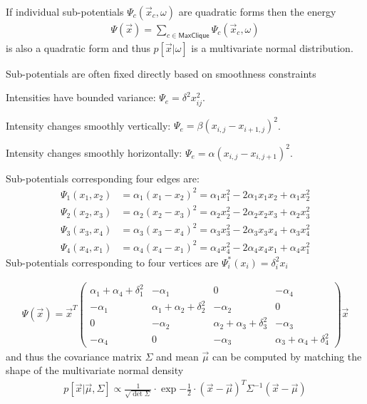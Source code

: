 \documentclass[landscape,footrule]{foils}
\begin{document}

If individual sub-potentials $\Psi_c(\vec{x}_c,\omega)$ are quadratic forms then the energy 
\begin{align*}
\Psi(\vec{x})=\sum_{c\in\textsf{MaxClique}}\Psi_c(\vec{x}_c,\omega) 
\end{align*} 
is also a quadratic form and thus $p[\vec{x}|\omega]$ is a multivariate normal distribution.\vspace*{1cm}

Sub-potentials are often fixed directly based on smoothness constraints
\begin{triangles}
\item Intensities have bounded variance: $\Psi_e=\delta^2 x_{ij}^2$. 
\item Intensity changes smoothly vertically: $\Psi_e=\beta(x_{i,j}-x_{i+1,j})^2$.
\item Intensity changes smoothly horizontally: $\Psi_e=\alpha(x_{i,j}-x_{i,j+1})^2$.
\end{triangles} 


\vspace*{-0.6cm}

Sub-potentials corresponding four edges are:  
\begin{align*}
\Psi_1(x_1,x_2)&= \alpha_1(x_{1}-x_2)^2=\alpha_1 x_1^2-2\alpha_1 x_1x_2+\alpha_1 x_2^2\\
\Psi_2(x_2,x_3)&= \alpha_2(x_{2}-x_3)^2=\alpha_2 x_2^2-2\alpha_2 x_2x_3+\alpha_2 x_3^2\\
\Psi_3(x_3,x_4)&= \alpha_3(x_{3}-x_4)^2=\alpha_3 x_3^2-2\alpha_3 x_3x_4+\alpha_3 x_4^2\\
\Psi_4(x_4,x_1)&= \alpha_4(x_{4}-x_1)^2=\alpha_4 x_4^2-2\alpha_4 x_4x_1+\alpha_4 x_1^2
\end{align*}
Sub-potentials corresponding to four vertices are $\Psi_i^*(x_i)=\delta_i^2 x_i$ 


\begin{align*}
\Psi(\vec{x})=\vec{x}^T
\begin{pmatrix}
\alpha_1+\alpha_4+\delta_1^2 & -\alpha_1 & 0 & -\alpha_4\\
-\alpha_1 &\alpha_1+\alpha_2+\delta_2^2 & -\alpha_2 & 0 \\
0 &-\alpha_2 &\alpha_2+\alpha_3+\delta_3^2 & -\alpha_3 \\
-\alpha_4 & 0 &-\alpha_3 &\alpha_3+\alpha_4+\delta_4^2 
\end{pmatrix}
\vec{x}
\end{align*}
and thus the covariance matrix $\Sigma$ and mean $\vec{\mu}$ can be computed by matching the shape of the multivariate normal density
\begin{align*}
p[\vec{x}|\vec{\mu},\Sigma]\propto\frac{1}{\sqrt{\det\Sigma}}\cdot\exp{-\frac{1}{2}\cdot 
(\vec{x}-\vec{\mu})^T\Sigma^{-1}(\vec{x}-\vec{\mu})}
\end{align*}
\end{document}
